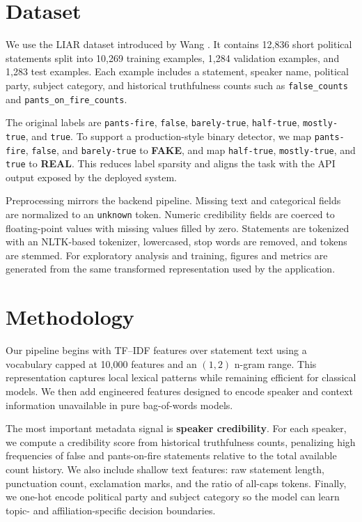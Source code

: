 \documentclass[10pt,twocolumn,letterpaper]{article}
\begin{document}
\section{Dataset}
We use the LIAR dataset introduced by Wang \cite{wang2017liar}. It contains 12{,}836 short political statements split into 10{,}269 training examples, 1{,}284 validation examples, and 1{,}283 test examples. Each example includes a statement, speaker name, political party, subject category, and historical truthfulness counts such as \texttt{false\_counts} and \texttt{pants\_on\_fire\_counts}.

The original labels are \texttt{pants-fire}, \texttt{false}, \texttt{barely-true}, \texttt{half-true}, \texttt{mostly-true}, and \texttt{true}. To support a production-style binary detector, we map \texttt{pants-fire}, \texttt{false}, and \texttt{barely-true} to \textbf{FAKE}, and map \texttt{half-true}, \texttt{mostly-true}, and \texttt{true} to \textbf{REAL}. This reduces label sparsity and aligns the task with the API output exposed by the deployed system.

Preprocessing mirrors the backend pipeline. Missing text and categorical fields are normalized to an \texttt{unknown} token. Numeric credibility fields are coerced to floating-point values with missing values filled by zero. Statements are tokenized with an NLTK-based tokenizer, lowercased, stop words are removed, and tokens are stemmed. For exploratory analysis and training, figures and metrics are generated from the same transformed representation used by the application.

\section{Methodology}
Our pipeline begins with TF--IDF features over statement text using a vocabulary capped at 10{,}000 features and an $(1,2)$ n-gram range. This representation captures local lexical patterns while remaining efficient for classical models. We then add engineered features designed to encode speaker and context information unavailable in pure bag-of-words models.

The most important metadata signal is \textbf{speaker credibility}. For each speaker, we compute a credibility score from historical truthfulness counts, penalizing high frequencies of false and pants-on-fire statements relative to the total available count history. We also include shallow text features: raw statement length, punctuation count, exclamation marks, and the ratio of all-caps tokens. Finally, we one-hot encode political party and subject category so the model can learn topic- and affiliation-specific decision boundaries.
\end{document}
